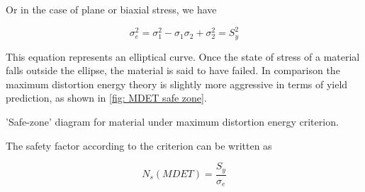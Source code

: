 \documentclass[
10pt,
a4paper,
openany,
svgnames,
]{kaobook} %
\begin{document}
Or in the case of plane or biaxial stress, we have

\begin{equation}
  \sigma_e^2 = \sigma_1^2 - \sigma_1\sigma_2 + \sigma_2^2 = S_y^2
\end{equation}

This equation represents an elliptical curve. Once the state of stress of a material falls outside the ellipse, the material is said to have failed.
In comparison the maximum distortion energy theory is slightly more aggressive in terms of yield prediction, as shown in \cref{fig: MDET safe zone}.

\begin{marginfigure}
  \centering
  \caption{'Safe-zone' diagram for material under maximum distortion energy criterion.}
  \label{fig: MDET safe zone}
\end{marginfigure}

The safety factor according to the criterion can be written as

\begin{equation}
  N_s(MDET) = \frac{S_y}{\sigma_e}
\end{equation}
\end{document}
